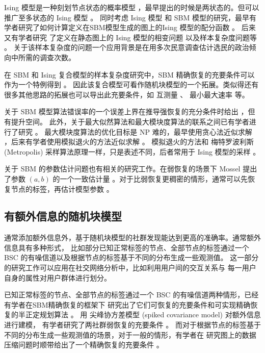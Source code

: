 \documentclass{ctexart}
\begin{document}
Ising 模型是一种刻划节点状态的概率模型 \cite{ising1925beitrag}，最早提出的时候是两状态的。但可以推广至多状态的 Ising 模型 \cite{potts1952some}。
同时考虑 Ising 模型 和 SBM 模型的研究，最早有学者研究了如何计算定义在SBM模型生成的图上的Ising 模型的配分函数 \cite{liu2017log}。
后来又有学者研究 了定义在静态图上的 Ising 模型的相变问题 \cite{berthet2019exact} 以及样本复杂度问题等 \cite{ye2020exact}。
关于该样本复杂度的问题一个应用背景是在用多次民意调查估计选民的政治倾向中所需的调查次数。

在 SBM 和 Ising 复合模型的样本复杂度研究中，SBM 精确恢复的充要条件可以作为一个特例得到 \cite{ye2020exact}。
因此该复合模型可看作随机块模型的一个拓展。类似得还有很多其他思路的拓展也可以导出此充要条件，如 互测量 \cite{chen2016information}、 最小最大速率 \cite{zhang2016} 等。

关于 SBM 模型算法错误率的一个误差上界在推导强恢复的充分条件时给出 \cite{abbe2015exact}，但有提升空间。
此外，关于最大似然算法和最大模块度算法的联系之间已有学者进行了研究 \cite{newman2016equivalence}。
最大模块度算法的优化目标是 NP 难的，最早使用贪心法近似求解 \cite{clauset2004finding}，后来有学者使用模拟退火的方法近似求解 \cite{he2016fast}。
模拟退火的方法和 梅特罗波利斯 (Metropolis) 采样算法原理一样，只是表述不同，后者常用于 Ising 模型的采样 \cite{metropolis1953equation}。

关于 SBM 的参数估计问题也有相关的研究工作。在弱恢复的场景下 Mossel 提出了参数 $(a,b)$ 的一个一致估计量
\cite{mossel2015reconstruction}。对于比弱恢复更稠密的情形，通常可以先恢复节点的标签，再估计模型参数
\cite{abbe2015recovering}。

\subsection{有额外信息的随机块模型}
通常添加额外信息外，基于随机块模型的社群发现能达到更高的准确率。通常额外信息具有多种形式，
比如部分已知正常标签的节点、全部节点的标签通过一个 BSC 的有噪信道以及根据节点的标签基于不同的分布生成一些观测值\cite{saad2018community}。
这一部分的研究工作可以应用在社交网络分析中，比如利用用户间的交互关系与
每一用户自身的属性对用户群体进行划分。

已知正常标签的节点、全部节点的标签通过一个 BSC 的有噪信道两种情形，已经有学者在SBM精确恢复的框架下
研究出了它们可恢复的充要条件和可实现精确恢复的半正定规划算法 \cite{esmaeili2019community, esmaeili2019exact}。
用 尖峰协方差模型 (spiked covariance model) 对额外信息
进行建模，
有学者研究了两社群弱恢复的充要条件 \cite{deshpande2018contextual}。
而对于根据节点的标签基于不同的分布生成一些观测值的场景，对于一般的情形，有学者在
研究图上的数据压缩问题时顺带给出了一个精确恢复的充要条件 \cite{abbe17sideinfo}。
\end{document}
